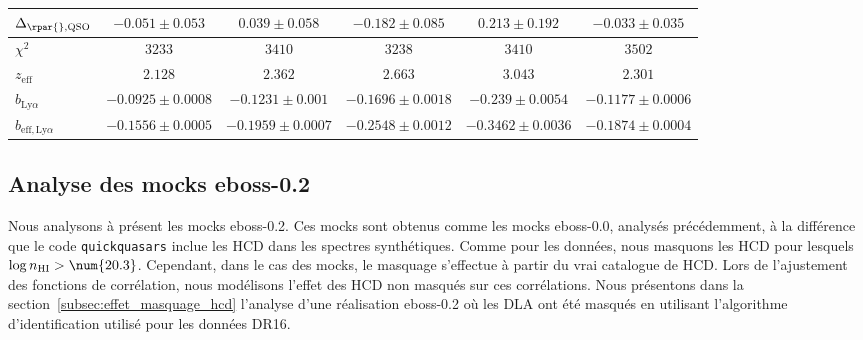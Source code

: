 \begin{table}[h]
\begin{tabular}{lccccc}
$\Delta_{\rpar{}, \textsc{QSO}}$ & $ -0.051 \pm 0.053$ & $ 0.039 \pm 0.058$ & $ -0.182 \pm 0.085$ & $ 0.213 \pm 0.192$ & $ -0.033 \pm 0.035$ \\
\midrule
$\chi^2$ & $ 3233 $ & $ 3410 $ & $ 3238 $ & $ 3410 $ & $ 3502 $ \\
$z_{\mathrm{eff}}$ & $ 2.128 $ & $ 2.362 $ & $ 2.663 $ & $ 3.043 $ & $ 2.301 $ \\
\midrule
$b_{\mathrm{Ly}\alpha} $ & $ -0.0925 \pm 0.0008$ & $ -0.1231 \pm 0.001$ & $ -0.1696 \pm 0.0018$ & $ -0.239 \pm 0.0054$ & $ -0.1177 \pm 0.0006$ \\
$b_{\mathrm{eff}, \mathrm{Ly}\alpha} $ & $ -0.1556 \pm 0.0005$ & $ -0.1959 \pm 0.0007$ & $ -0.2548 \pm 0.0012$ & $ -0.3462 \pm 0.0036$ & $ -0.1874 \pm 0.0004$ \\
\bottomrule
  \end{tabular}
\end{table}


\newpage
\subsection{Analyse des mocks eboss-0.2}
\label{subsec:ana_eboss-0.2}
Nous analysons à présent les mocks eboss-0.2. Ces mocks sont obtenus comme les mocks eboss-0.0, analysés précédemment, à la différence que le code \texttt{quickquasars} inclue les HCD dans les spectres synthétiques.
Comme pour les données, nous masquons les HCD pour lesquels $\log n_{\textsc{HI}} > \num{20.3}$. Cependant, dans le cas des mocks, le masquage s'effectue à partir du vrai catalogue de HCD.
Lors de l'ajustement des fonctions de corrélation, nous modélisons l'effet des HCD non masqués sur ces corrélations.
Nous présentons dans la section~\ref{subsec:effet_masquage_hcd} l'analyse d'une réalisation eboss-0.2 où les DLA ont été masqués en utilisant l'algorithme d'identification utilisé pour les données DR16.


